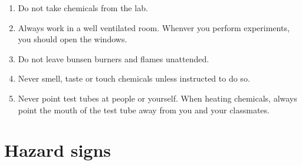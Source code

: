 \begin{enumerate}[noitemsep, label=\textbf{\arabic*}. ]
\item Do not take chemicals from the lab.
\item Always work in a well ventilated room. Whenver you perform experiments, you should open the windows.
\item Do not leave bunsen burners and flames unattended. 
\item Never smell, taste or touch chemicals unless instructed to do so.
\item Never point test tubes at people or yourself. When heating chemicals, always point the mouth of the test tube away from you and your classmates.
\end{enumerate}
\par 
\section{ Hazard signs}
            \nopagebreak
